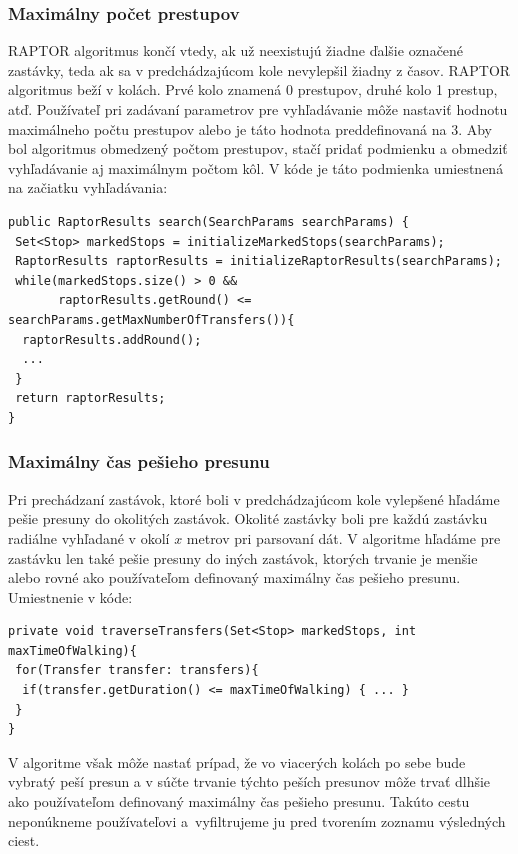 \subsubsection{Maximálny počet prestupov}
RAPTOR algoritmus končí vtedy, ak už neexistujú žiadne ďalšie označené zastávky, teda ak sa v predchádzajúcom kole nevylepšil žiadny z časov. RAPTOR algoritmus beží v kolách. Prvé kolo znamená 0 prestupov, druhé kolo 1 prestup, atď. Používateľ pri zadávaní parametrov pre vyhľadávanie môže nastaviť hodnotu maximálneho počtu prestupov alebo je táto hodnota preddefinovaná na $3$. Aby bol algoritmus obmedzený počtom prestupov, stačí pridať podmienku a obmedziť vyhľadávanie aj maximálnym počtom kôl. V kóde je táto podmienka umiestnená na začiatku vyhľadávania:\\
\begin{lstlisting} 
public RaptorResults search(SearchParams searchParams) {
 Set<Stop> markedStops = initializeMarkedStops(searchParams);
 RaptorResults raptorResults = initializeRaptorResults(searchParams);
 while(markedStops.size() > 0 && 
       raptorResults.getRound() <= searchParams.getMaxNumberOfTransfers()){   
  raptorResults.addRound();     
  ...
 }
 return raptorResults;
}
\end{lstlisting}

\subsubsection{Maximálny čas pešieho presunu}
Pri prechádzaní zastávok, ktoré boli v predchádzajúcom kole vylepšené hľadáme pešie presuny do okolitých zastávok. Okolité zastávky boli pre každú zastávku radiálne vyhľadané v okolí $x$ metrov pri parsovaní dát. V algoritme hľadáme pre zastávku len také pešie presuny do iných zastávok, ktorých trvanie je menšie alebo rovné ako používateľom definovaný maximálny čas pešieho presunu. Umiestnenie v kóde:
\begin{lstlisting}
private void traverseTransfers(Set<Stop> markedStops, int maxTimeOfWalking){
 for(Transfer transfer: transfers){
  if(transfer.getDuration() <= maxTimeOfWalking) { ... }
 }
}
\end{lstlisting} 

V algoritme však môže nastať prípad, že vo viacerých kolách po sebe bude vybratý peší presun a v súčte trvanie týchto peších presunov môže trvať dlhšie ako používateľom definovaný maximálny čas pešieho presunu.
Takúto cestu neponúkneme používateľovi a~vyfiltrujeme ju pred tvorením zoznamu výsledných ciest.

